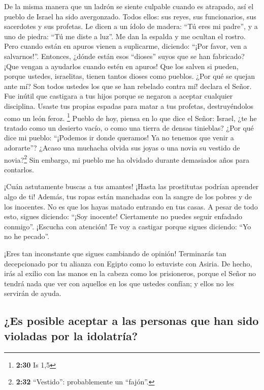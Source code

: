  De la misma manera que un ladrón se siente culpable
cuando es atrapado, así el pueblo de Israel ha sido avergonzado. Todos
ellos: sus reyes, sus funcionarios, sus sacerdotes y sus profetas.
 Le dicen a un ídolo de madera: ``Tú eres mi padre'', y a
uno de piedra: ``Tú me diste a luz''. Me dan la espalda y me ocultan el
rostro. Pero cuando están en apuros vienen a suplicarme, diciendo:
``¡Por favor, ven a salvarnos!''.  Entonces, ¿dónde están
esos ``dioses'' suyos que se han fabricado? ¡Que vengan a ayudarlos
cuando estén en apuros! Que los salven si pueden, porque ustedes,
israelitas, tienen tantos dioses como pueblos.  ¿Por qué
se quejan ante mí? Son todos ustedes los que se han rebelado contra mí!
declara el Señor.  Fue inútil que castigara a tus hijos
porque se negaron a aceptar cualquier disciplina. Usaste tus propias
espadas para matar a tus profetas, destruyéndolos como un león feroz.
\footnote{\textbf{2:30} Is 1,5}  Pueblo de hoy, piensa en
lo que dice el Señor: Israel, ¿te he tratado como un desierto vacío, o
como una tierra de densas tinieblas? ¿Por qué dice mi pueblo: ``¡Podemos
ir donde queramos! Ya no tenemos que venir a adorarte''? 
¿Acaso una muchacha olvida sus joyas o una novia su vestido de
novia?\footnote{\textbf{2:32} ``Vestido'': probablemente un ``fajón''.}
Sin embargo, mi pueblo me ha olvidado durante demasiados años para
contarlos.

 ¡Cuán astutamente buscas a tus amantes! ¡Hasta las
prostitutas podrían aprender algo de ti!  Además, tus
ropas están manchadas con la sangre de los pobres y de los inocentes. No
es que los hayas matado entrando en tus casas. A pesar de todo esto,
 sigues diciendo: ``¡Soy inocente! Ciertamente no puedes
seguir enfadado conmigo''. ¡Escucha con atención! Te voy a castigar
porque sigues diciendo: ``Yo no he pecado''.

 ¡Eres tan inconstante que sigues cambiando de opinión!
Terminarás tan decepcionado por tu alianza con Egipto como lo estuviste
con Asiria.  De hecho, irás al exilio con las manos en la
cabeza como los prisioneros, porque el Señor no tendrá nada que ver con
aquellos en los que ustedes confían; y ellos no les servirán de ayuda.

\hypertarget{es-posible-aceptar-a-las-personas-que-han-sido-violadas-por-la-idolatruxeda}{%
\subsection{¿Es posible aceptar a las personas que han sido violadas por
la
idolatría?}\label{es-posible-aceptar-a-las-personas-que-han-sido-violadas-por-la-idolatruxeda}}

